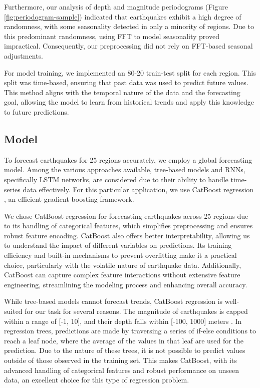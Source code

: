 Furthermore, our analysis of depth and magnitude periodograms (Figure \ref{fig:periodogram-sample})
indicated that earthquakes
exhibit a high degree of randomness, with some seasonality detected in only a minority
of regions. Due to this predominant randomness, using \ac{FFT}
to model seasonality proved impractical. Consequently, our preprocessing did not
rely on \ac{FFT}-based seasonal adjustments.

For model training, we implemented an 80-20 train-test split for each region. This
split was time-based, ensuring that past data was used to predict future values.
This method aligns with the temporal nature of the data and the forecasting goal,
allowing the model to learn from historical trends and apply this knowledge to
future predictions.

\subsection{Model}

To forecast earthquakes for 25 regions accurately, we employ a global forecasting model.
Among the various approaches available, tree-based models and \ac{RNNs}, specifically
\ac{LSTM} networks, are considered due to their ability to handle time-series data
effectively. For this particular application, we use CatBoost regression
\parencite{prokhorenkova2018catboost}, an efficient gradient boosting framework.

We chose CatBoost regression for forecasting earthquakes across 25 regions due to
its handling of categorical features, which simplifies preprocessing and ensures
robust feature encoding. CatBoost also offers better interpretability, allowing us
to understand the impact of different variables on predictions. Its training
efficiency and built-in mechanisms to prevent overfitting make it a practical
choice, particularly with the volatile nature of earthquake data. Additionally,
CatBoost can capture complex feature interactions without extensive feature
engineering, streamlining the modeling process and enhancing overall accuracy.

While tree-based models cannot forecast trends, CatBoost regression
is well-suited for our task for several reasons. The magnitude of
earthquakes is capped within a range of [-1, 10], and their depth falls within
  [-100, 1000] meters \parencite{earthquake-data}. In regression trees, predictions
are made by traversing a series of if-else conditions to reach a leaf node, where
the average of the values in that leaf are used for the prediction. Due to the
nature of these trees, it is not possible to predict values outside of those
observed in the training set. This makes CatBoost, with its advanced handling
of categorical features and robust performance on unseen data, an excellent
choice for this type of regression problem.

